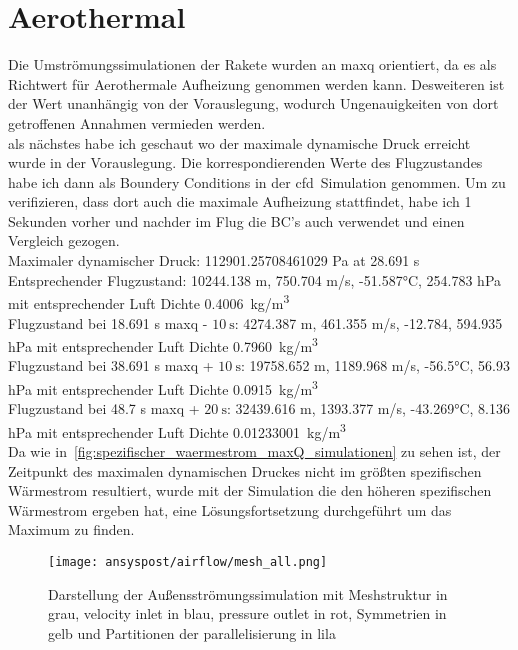 \section{Aerothermal}

Die Umströmungssimulationen der Rakete wurden an \ac{maxq} orientiert, da es als Richtwert für Aerothermale Aufheizung genommen werden kann.
Desweiteren ist der Wert unanhängig von der Vorauslegung, wodurch Ungenauigkeiten von dort getroffenen Annahmen vermieden werden.\\


als nächstes habe ich geschaut wo der maximale dynamische Druck erreicht wurde in der Vorauslegung. Die korrespondierenden Werte des Flugzustandes
habe ich dann als Boundery Conditions in der \ac{cfd}~Simulation genommen.
Um zu verifizieren, dass dort auch die maximale Aufheizung stattfindet, habe ich 1 Sekunden vorher und nachder
im Flug die BC's auch verwendet und einen Vergleich gezogen.\\
Maximaler dynamischer Druck: 112901.25708461029 Pa at 28.691 s\\
Entsprechender Flugzustand: 10244.138 m, 750.704 m/s, -51.587°C, 254.783 hPa mit entsprechender Luft Dichte \SI{0.4006}{kg/m^3}\\
Flugzustand bei 18.691 s \ac{maxq} - $\SI{10}{\second}$: 4274.387 m, 461.355 m/s, -12.784, 594.935 hPa mit entsprechender Luft Dichte \SI{0.7960}{kg/m^3}\\
Flugzustand bei 38.691 s \ac{maxq} + $\SI{10}{\second}$: 19758.652 m, 1189.968 m/s, -56.5°C, 56.93 hPa mit entsprechender Luft Dichte \SI{0.0915}{kg/m^3}\\
Flugzustand bei 48.7 s \ac{maxq} + $\SI{20}{\second}$: 32439.616 m, 1393.377 m/s, -43.269°C, 8.136 hPa mit entsprechender Luft Dichte \SI{0.01233001}{kg/m^3}\\
Da wie in~\ref{fig:spezifischer_waermestrom_maxQ_simulationen} zu sehen ist, der Zeitpunkt des maximalen dynamischen Druckes nicht im größten spezifischen
Wärmestrom resultiert, wurde mit der Simulation die den höheren spezifischen Wärmestrom ergeben hat, eine Lösungsfortsetzung durchgeführt um das Maximum zu finden.\\

\begin{figure}[H]
  \centering
  \texttt{[image: ansyspost/airflow/mesh\_all.png]}
  \caption{Darstellung der Außensströmungssimulation mit Meshstruktur in grau, velocity inlet in blau, pressure outlet in rot, Symmetrien in gelb und Partitionen der parallelisierung in lila}\label{fig:aussenstroemung_mesh}
\end{figure}

